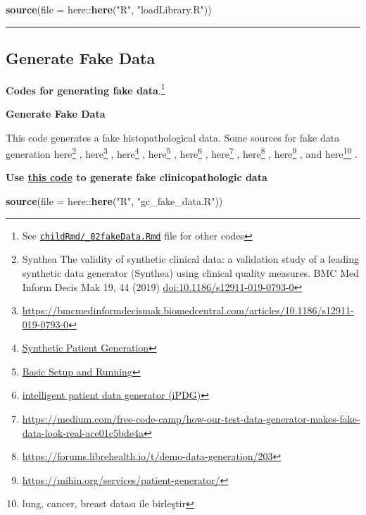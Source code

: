\documentclass[
]{article}
\newenvironment{Shaded}{\begin{snugshade}}{\end{snugshade}}
\newcommand{\DataTypeTok}[1]{\textcolor[rgb]{0.00,0.34,0.68}{#1}}
\newcommand{\KeywordTok}[1]{\textcolor[rgb]{0.12,0.11,0.11}{\textbf{#1}}}
\newcommand{\NormalTok}[1]{\textcolor[rgb]{0.12,0.11,0.11}{#1}}
\newcommand{\OperatorTok}[1]{\textcolor[rgb]{0.12,0.11,0.11}{#1}}
\newcommand{\StringTok}[1]{\textcolor[rgb]{0.75,0.01,0.01}{#1}}
\begin{document}
\begin{Shaded}
\begin{Highlighting}[]
\KeywordTok{source}\NormalTok{(}\DataTypeTok{file =}\NormalTok{ here}\OperatorTok{::}\KeywordTok{here}\NormalTok{(}\StringTok{"R"}\NormalTok{, }\StringTok{"loadLibrary.R"}\NormalTok{))}
\end{Highlighting}
\end{Shaded}

\begin{center}\rule{0.5\linewidth}{0.5pt}\end{center}

\hypertarget{generate-fake-data}{%
\subsection{Generate Fake Data}\label{generate-fake-data}}

\textbf{Codes for generating fake data}.\footnote{See
  \href{https://github.com/sbalci/histopathology-template/blob/master/childRmd/_02fakeData.Rmd}{\texttt{childRmd/\_02fakeData.Rmd}}
  file for other codes}

\textbf{Generate Fake Data}

This code generates a fake histopathological data. Some sources for fake
data generation here\footnote{Synthea The validity of synthetic clinical
  data: a validation study of a leading synthetic data generator
  (Synthea) using clinical quality measures. BMC Med Inform Decis Mak
  19, 44 (2019) \url{doi:10.1186/s12911-019-0793-0}} , here\footnote{\url{https://bmcmedinformdecismak.biomedcentral.com/articles/10.1186/s12911-019-0793-0}}
, here\footnote{\href{https://synthetichealth.github.io/synthea/}{Synthetic
  Patient Generation}} , here\footnote{\href{https://github.com/synthetichealth/synthea/wiki/Basic-Setup-and-Running}{Basic
  Setup and Running}} , here\footnote{\href{http://www.mli.gmu.edu/index.php/research/ipdg/}{intelligent
  patient data generator (iPDG)}} , here\footnote{\url{https://medium.com/free-code-camp/how-our-test-data-generator-makes-fake-data-look-real-ace01c5bde4a}}
, here\footnote{\url{https://forums.librehealth.io/t/demo-data-generation/203}}
, here\footnote{\url{https://mihin.org/services/patient-generator/}} ,
and here\footnote{lung, cancer, breast datası ile birleştir} .

\textbf{Use
\href{https://github.com/sbalci/histopathology-template/blob/master/R/gc_fake_data.R}{this
code} to generate fake clinicopathologic data}

\begin{Shaded}
\begin{Highlighting}[]
\KeywordTok{source}\NormalTok{(}\DataTypeTok{file =}\NormalTok{ here}\OperatorTok{::}\KeywordTok{here}\NormalTok{(}\StringTok{"R"}\NormalTok{, }\StringTok{"gc_fake_data.R"}\NormalTok{))}
\end{Highlighting}
\end{Shaded}
\end{document}
